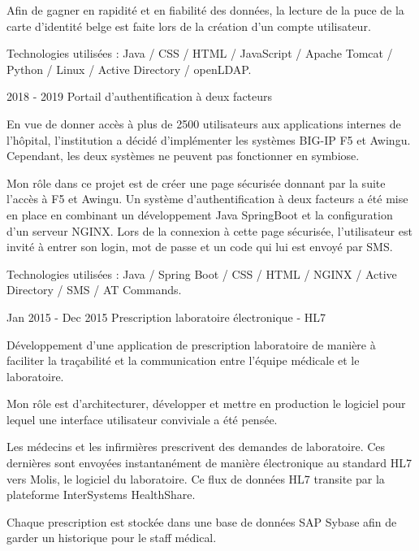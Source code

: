 \begin{cventries}
{    Afin de gagner en rapidité et en fiabilité des données, la lecture de la puce de la carte d'identité belge est faite lors de la création d'un compte utilisateur. 

    Technologies utilisées : Java / CSS / HTML / JavaScript / Apache Tomcat / Python / Linux / Active Directory / openLDAP.

    }
    
    
  \cventry
    {2018 - 2019} %
    {Portail d'authentification à deux facteurs} %
    {} %
    {} %
    {
    En vue de donner accès à plus de 2500 utilisateurs aux applications internes de l'hôpital, l'institution a décidé d'implémenter les systèmes BIG-IP F5 et Awingu. Cependant, les deux systèmes ne peuvent pas fonctionner en symbiose. 
    
    Mon rôle dans ce projet est de créer une page sécurisée donnant par la suite l'accès à F5 et Awingu. 
    Un système d'authentification à deux facteurs a été mise en place en combinant un développement Java SpringBoot et la configuration d'un serveur NGINX. Lors de la connexion à cette page sécurisée, l'utilisateur est invité à entrer son login, mot de passe et un code qui lui est envoyé par SMS.

    Technologies utilisées : Java / Spring Boot / CSS / HTML / NGINX / Active Directory / SMS / AT Commands.

    }
    
    
    
    
  \cventry
    {Jan 2015 - Dec 2015} %
    {Prescription laboratoire électronique - HL7} %
    {} %
    {} %
    {
    Développement d'une application de prescription laboratoire de manière à faciliter la traçabilité et la communication entre l'équipe médicale et le laboratoire. 

    Mon rôle est d'architecturer, développer et mettre en production le logiciel pour lequel une interface utilisateur conviviale a été pensée. 

    Les médecins et les infirmières prescrivent des demandes de laboratoire. Ces dernières sont envoyées instantanément de manière électronique au standard HL7 vers Molis, le logiciel du laboratoire.
    Ce flux de données HL7 transite par la plateforme InterSystems HealthShare.
    
    Chaque prescription est stockée dans une base de données SAP Sybase afin de garder un historique pour le staff médical.
    
}
\end{cventries}
